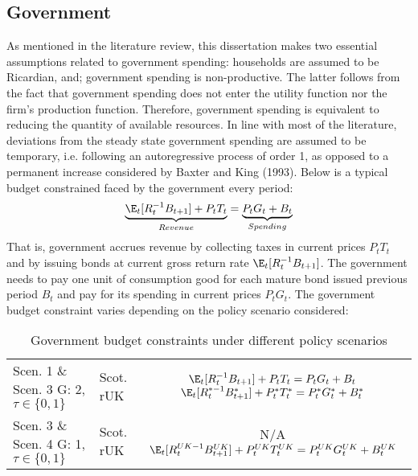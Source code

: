 \subsection{Government}

As mentioned in the literature review, this dissertation makes two essential assumptions related to government spending: households are assumed to be Ricardian, and; government spending is non-productive. The latter follows from the fact that government spending does not enter the utility function nor the firm's production function. Therefore, government spending is equivalent to reducing the quantity of available resources. In line with most of the literature, deviations from the steady state government spending are assumed to be temporary, i.e. following an autoregressive process of order 1, as opposed to a permanent increase considered by Baxter and King (1993). Below is a typical budget constrained faced by the government every period:
\begin{align}
    \underbrace{\E_t [R^{-1}_tB_{t+1}] + P_t T_t}_{Revenue} = \underbrace{P_tG_t + B_t}_{Spending}
\end{align}
That is, government accrues revenue by collecting taxes in current prices $P_t T_t$ and by issuing bonds at current gross return rate $\E_t [R^{-1}_tB_{t+1}]$. The government needs to pay one unit of consumption good for each mature bond issued previous period $B_t$ and pay for its spending in current prices $P_t G_t$. The government budget constraint varies depending on the policy scenario considered:
\begin{table}[H]
    \renewcommand{\arraystretch}{2}
    \centering
    \begin{tabular}{l|l|c}
    \makecell{Scen. 1 \& Scen. 3\\ G: 2, $\tau \in \{0, 1\}$} & \makecell{Scot. \\ rUK } & 
        \makecell{
            $\E_t [R^{-1}_tB_{t+1}] + P_t T_t = P_tG_t + B_t$\\
            $\E_t [{R^{*-1}_{t}}B^*_{t+1}] + P^*_tT^*_t = P^*_tG^*_t + B^*_t$
        }  \\ 
    \makecell{Scen. 3 \& Scen. 4\\ G: 1, $\tau \in \{0, 1\}$} & \makecell{Scot. \\ rUK } & 
        \makecell{
            N/A\\
            $\E_t [{R^{UK-1}_{t}}B^{UK}_{t+1}] + P^{UK}_tT^{UK}_t = P^{UK}_tG^{UK}_t + B^{UK}_t$
        } 
    \end{tabular}
    \caption{Government budget constraints under different policy scenarios}
\end{table}

